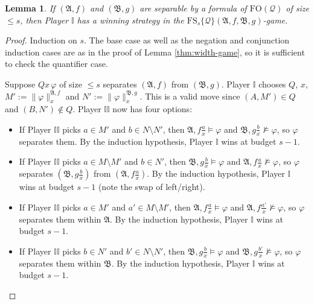 \documentclass{article}
\newtheorem{lemma}[theorem]{Lemma}
\theoremstyle{definition}
\begin{document}
\begin{lemma}\label{lem:model-game-sound}
    If $(\mathfrak{A},f)$ and $(\mathfrak{B},g)$ are separable by a formula of $\mathrm{FO}(\mathcal{Q})$ of size $\leq s$, then Player $\mathbb{I}$ has a winning strategy in the $\mathrm{FS}_s\{\mathcal{Q}\}(\mathfrak{A},f,\mathfrak{B},g)$-game.
\end{lemma}
\begin{proof}
    Induction on $s$. The base case as well as the negation and conjunction induction cases are as in the proof of Lemma \ref{thm:width-game}, so it is sufficient to check the quantifier case.

    Suppose $Qx\,\varphi$ of size $\leq s$ separates
    $(\mathfrak{A},f)$ from $(\mathfrak{B},g)$. Player $\mathbb{I}$ chooses
    $Q$, $x$, $M':=\|\varphi\|^{\mathfrak{A},f}_x$ and
    $N':=\|\varphi\|^{\mathfrak{B},g}_x$. This is a valid move since
    $(A,M')\in Q$ and $(B,N')\notin Q$. Player $\mathbb{II}$ now has four options:
    \begin{itemize}
        \item If Player $\mathbb{II}$ picks $a\in M'$ and
        $b\in N\setminus N'$, then
        $\mathfrak{A},f\frac{a}{x}\models\varphi$ and
        $\mathfrak{B},g\frac{b}{x}\not\models\varphi$, so $\varphi$
        separates them. By the induction hypothesis, Player $\mathbb{I}$ wins at budget
        $s-1$.
        \item If Player $\mathbb{II}$ picks $a\in M\setminus M'$ and
        $b\in N'$, then
        $\mathfrak{B},g\frac{b}{x}\models\varphi$ and
        $\mathfrak{A},f\frac{a}{x}\not\models\varphi$, so $\varphi$
        separates $(\mathfrak{B},g\frac{b}{x})$ from
        $(\mathfrak{A},f\frac{a}{x})$. By the induction hypothesis, Player $\mathbb{I}$
        wins at budget $s-1$ (note the swap of left/right).
        \item If Player $\mathbb{II}$ picks $a\in M'$ and
        $a'\in M\setminus M'$, then
        $\mathfrak{A},f\frac{a}{x}\models\varphi$ and
        $\mathfrak{A},f\frac{a'}{x}\not\models\varphi$, so $\varphi$
        separates them within $\mathfrak{A}$. By the induction hypothesis, Player
        $\mathbb{I}$ wins at budget $s-1$.
        \item If Player $\mathbb{II}$ picks $b\in N'$ and
        $b'\in N\setminus N'$, then
        $\mathfrak{B},g\frac{b}{x}\models\varphi$ and
        $\mathfrak{B},g\frac{b'}{x}\not\models\varphi$, so $\varphi$
        separates them within $\mathfrak{B}$. By the induction hypothesis, Player
        $\mathbb{I}$ wins at budget $s-1$.\qedhere
    \end{itemize}
\end{proof}
\end{document}
